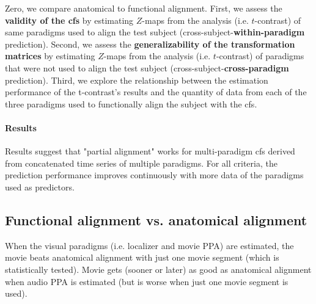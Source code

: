 

%
Zero, we compare anatomical to functional alignment.
%
First, we assess the \textbf{validity of the \ac{cfs}} by estimating $Z$-maps
from the analysis (i.e. $t$-contrast) of same paradigms used to align the test
subject (cross-subject-\textbf{within-paradigm} prediction).
%
Second, we assess the \textbf{generalizability of the transformation matrices}
by estimating $Z$-maps from the analysis (i.e. $t$-contrast) of paradigms that
were not used to align the test subject (cross-subject-\textbf{cross-paradigm}
prediction).
%
Third, we explore the relationship between the estimation performance of the
t-contrast's results and the quantity of data from each of the three paradigms
used to functionally align the subject with the \ac{cfs}.


\paragraph{Results}



Results suggest that "partial alignment" works for multi-paradigm \ac{cfs}
derived from concatenated time series of multiple paradigms.
%
For all criteria, the prediction performance improves continuously with more
data of the paradigms used as predictors.


\subsection{Functional alignment vs. anatomical alignment}
%
When the visual paradigms (i.e. localizer and movie PPA) are estimated, the
movie beats anatomical alignment with just one movie segment (which is
statistically tested).
%
Movie gets (sooner or later) as good as anatomical alignment when audio PPA is
estimated (but is worse when just one movie segment is used).

